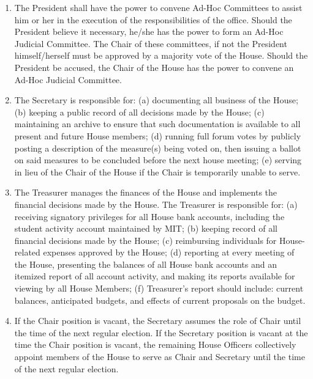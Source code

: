 \documentclass[letterpaper]{article}
\begin{document}
\begin{enumerate}
\begin{enumerate}
\begin{enumerate}
\item The President shall have the power to convene Ad-Hoc Committees to assist him or her in the execution of the responsibilities of the office. Should the President believe it necessary, he/she has the power to form an Ad-Hoc Judicial Committee. The Chair of these committees, if not the President himself/herself must be approved by a majority vote of the House. Should the President be accused, the Chair of the House has the power to convene an Ad-Hoc Judicial Committee.

\item The Secretary is responsible for: (a) documenting all business of the House; (b) keeping a public record of all decisions made by the House; (c) maintaining an archive to ensure that such documentation is available to all present and future House members; (d) running full forum votes by publicly posting a description of the measure(s) being voted on, then issuing a ballot on said measures to be concluded before the next house meeting; (e) serving in lieu of the Chair of the House
if the Chair is temporarily unable to serve.

\item The Treasurer manages the finances of the House and implements the financial decisions made by the House. The Treasurer is responsible for: (a) receiving signatory privileges for all House bank accounts, including the student activity account maintained by MIT; (b) keeping record of all financial decisions made by the House; (c) reimbursing individuals for House-related expenses approved by the House; (d) reporting at every meeting of the House, presenting the balances of all
House bank accounts and an itemized report of all account activity, and making its reports available for viewing by all House Members; (f) Treasurer's report should include: current balances, anticipated budgets, and effects of current proposals on the budget.

\item If the Chair position is vacant, the Secretary assumes the role of Chair until the time of the next regular election. If the Secretary position is vacant at the time the Chair position is vacant, the remaining House Officers collectively appoint members of the House to serve as Chair and Secretary until the time of the next regular
election.

\end{enumerate}

\end{enumerate}


\end{enumerate}
\end{document}

